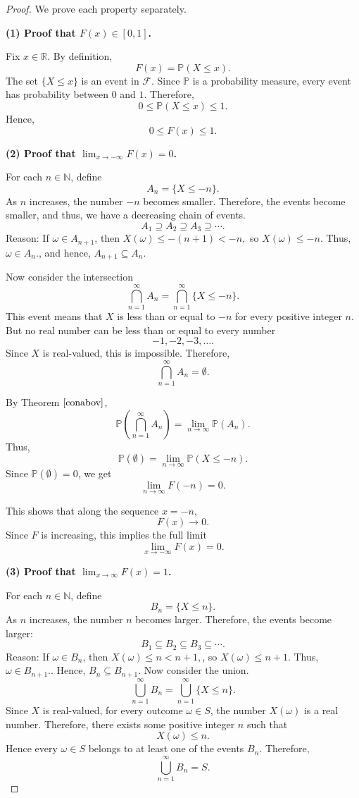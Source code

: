\documentclass[11pt]{article}
\newcommand{\Prob}{\mathbb{P}}
\newcommand{\Sample}{S}
\newcommand{\F}{\mathcal{F}}
\newcommand{\N}{\mathbb{N}}
\theoremstyle{definition}
\theoremstyle{plain}
\theoremstyle{remark}
\begin{document}
\begin{proof}
We prove each property separately.

\medskip

\noindent
\textbf{(1) Proof that $F(x)\in[0,1]$.}

Fix $x\in\mathbb{R}$. By definition,
\[
F(x)=\Prob(X\le x).
\]
The set $\{X\le x\}$ is an event in $\F$. Since $\Prob$ is a probability measure, every event has probability between $0$ and $1$. Therefore,
\[
0\le \Prob(X\le x)\le 1.
\]
Hence,
\[
0\le F(x)\le 1.
\]

\medskip

\noindent
\textbf{(2) Proof that $\displaystyle \lim_{x\to-\infty}F(x)=0$.}

For each $n\in\N$, define
\[
A_n=\{X\le -n\}.
\]
As $n$ increases, the number $-n$ becomes smaller. Therefore, the events become smaller, and thus, we have a decreasing chain of events.
\[
A_1\supseteq A_2\supseteq A_3\supseteq \cdots.
\]
Reason: If $\omega\in A_{n+1}$, then $X(\omega)\le -(n+1)<-n,$ so  $X(\omega)\le -n.
$ Thus, $\omega\in A_n.
$, and hence, $A_{n+1}\subseteq A_n.
$

Now consider the intersection
\[
\bigcap_{n=1}^{\infty}A_n
=
\bigcap_{n=1}^{\infty}\{X\le -n\}.
\]
This event means that $X$ is less than or equal to $-n$ for every positive integer $n$. But no real number can be less than or equal to every number
\[
-1,-2,-3,\ldots.
\]
Since $X$ is real-valued, this is impossible. Therefore,
\[
\bigcap_{n=1}^{\infty}A_n=\emptyset.
\]

By Theorem $\ref{conabov}$,
\[
\Prob\left(\bigcap_{n=1}^{\infty}A_n\right)
=
\lim_{n\to\infty}\Prob(A_n).
\]
Thus,
\[
\Prob(\emptyset)
=
\lim_{n\to\infty}\Prob(X\le -n).
\]
Since $\Prob(\emptyset)=0$, we get
\[
\lim_{n\to\infty}F(-n)=0.
\]

This shows that along the sequence $x=-n$,
\[
F(x)\to0.
\]
Since $F$ is increasing, this implies the full limit
\[
\lim_{x\to-\infty}F(x)=0.
\]

\medskip

\noindent
\textbf{(3) Proof that $\displaystyle \lim_{x\to\infty}F(x)=1$.}

For each $n\in\N$, define
\[
B_n=\{X\le n\}.
\]
As $n$ increases, the number $n$ becomes larger. Therefore, the events become larger:
\[
B_1\subseteq B_2\subseteq B_3\subseteq \cdots.
\]
Reason: If $\omega\in B_n$, then $X(\omega)\le n<n+1,
$, so $X(\omega)\le n+1.
$ Thus, $\omega\in B_{n+1}.
$. Hence, $B_n\subseteq B_{n+1}.
$
Now consider the union.
\[
\bigcup_{n=1}^{\infty}B_n
=
\bigcup_{n=1}^{\infty}\{X\le n\}.
\]
Since $X$ is real-valued, for every outcome $\omega\in\Sample$, the number $X(\omega)$ is a real number. Therefore, there exists some positive integer $n$ such that
\[
X(\omega)\le n.
\]
Hence every $\omega\in\Sample$ belongs to at least one of the events $B_n$. Therefore,
\[
\bigcup_{n=1}^{\infty}B_n=\Sample.
\]


\end{proof}
\end{document}
